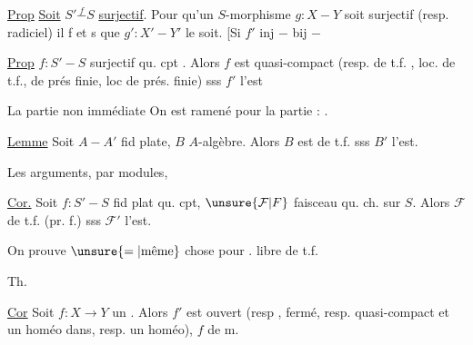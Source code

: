  


\uline{Prop} \uline{Soit} $S'\overset{f}{\mathrel{-}}S$ \uline{surjectif}. Pour qu'un $S$-morphisme $g:X\mathrel{-}Y$ soit surjectif (resp. radiciel) il f et s que $g':X'\mathrel{-}Y'$ le soit. [Si $f'$ inj $\mathrel{-}$ bij $\mathrel{-}$

\uline{Prop}  $f:S'\mathrel{-}S$ surjectif qu. cpt . Alors $f$ est quasi-compact  (resp. de t.f. \unsure{)}, loc. de t.f., de prés finie, loc de prés. finie) sss $f'$ l'est


La partie non  immédiate  On est ramené pour la partie  : .

\uline{Lemme} Soit $A\mathrel{-}A'$ fid plate, $B$ $A$-algèbre. Alors $B$ est de t.f.  sss $B'$ l'est.

Les  arguments, par modules, 

\uline{Cor.} Soit $f:S'\mathrel{-}S$ fid plat qu. cpt, $\unsure{\mathcal F|F}$ faisceau qu. ch. sur $S$. Alors $\mathcal F$ de t.f. (pr. f.) sss $\mathcal F'$ l'est.

On prouve $\unsure{=|\text{même}}$ chose pour . libre de t.f. 



Th.

\uline{Cor}  Soit $f:X\longrightarrow Y$ un . Alors   $f'$ est ouvert (resp , fermé, resp. quasi-compact et un homéo dans, resp. un homéo), $f$ de m.

